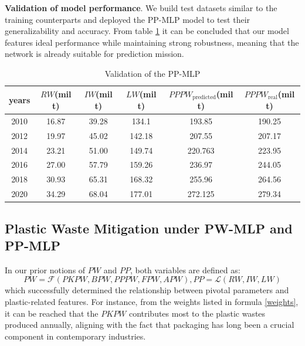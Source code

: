 \documentclass[12pt]{article}
\begin{document}
\textbf{Validation of model performance}. We build test datasets similar to the training counterparts and deployed the PP-MLP model to test their generalizability and accuracy. From table \ref{validation} it can be concluded that our model features ideal performance while maintaining strong robustness, meaning that the network is already suitable for prediction mission.

\begin{table}[h]
	\centering
	\begin{tabular}{cccccc}
		\toprule[2pt]
		years & $RW$(mil t) & $IW$(mil t) & $LW$(mil t) & $PPPW_\text{predicted}$(mil t) & $PPPW_\text{real}$(mil t) \\
		\midrule[1pt]
		2010 & 16.87 & 39.28 & 134.1 & 193.85 & 190.25 \\
		2012 & 19.97 & 45.02 & 142.18 & 207.55 & 207.17 \\
		2014& 23.21 & 51.00 & 149.74 & 220.763 & 223.95 \\
		2016 & 27.00 & 57.79 & 159.26 & 236.97 & 244.05 \\
		2018 & 30.93 & 65.31 & 168.32 &  255.96 & 264.56 \\
		2020 & 34.29 & 68.04 & 177.01 & 272.125 & 279.34 \\
		\bottomrule[2pt]
	\end{tabular}
	\caption{Validation of the PP-MLP}
	\label{validation}
\end{table}

\subsection{Plastic Waste Mitigation under PW-MLP and PP-MLP}
\hspace{2em}In our prior notions of $PW$ and $PP$, both variables are defined as: $$PW =\mathcal{F} (PKPW,BPW,PPPW,FPW,APW),PP=\mathcal{L}(RW,IW,LW)$$ which successfully determined the relationship between pivotal parameters and plastic-related features. For instance, from the weights listed in formula \ref{weights}, it can be reached that the $PKPW$ contributes most to the plastic wastes produced annually, aligning with the fact that packaging has long been a crucial component in contemporary industries. 
\end{document}
